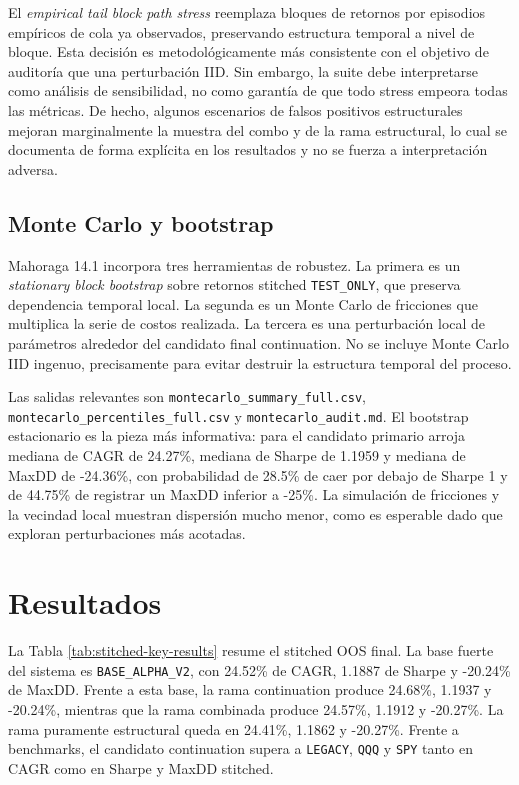 \documentclass[11pt]{article}
\begin{document}
El \textit{empirical tail block path stress} reemplaza bloques de retornos por episodios emp\'iricos de cola ya observados, preservando estructura temporal a nivel de bloque. Esta decisi\'on es metodol\'ogicamente m\'as consistente con el objetivo de auditor\'ia que una perturbaci\'on IID. Sin embargo, la suite debe interpretarse como an\'alisis de sensibilidad, no como garant\'ia de que todo stress empeora todas las m\'etricas. De hecho, algunos escenarios de falsos positivos estructurales mejoran marginalmente la muestra del combo y de la rama estructural, lo cual se documenta de forma expl\'icita en los resultados y no se fuerza a interpretaci\'on adversa.

\subsection*{Monte Carlo y bootstrap}
Mahoraga 14.1 incorpora tres herramientas de robustez. La primera es un \textit{stationary block bootstrap} sobre retornos stitched \texttt{TEST\_ONLY}, que preserva dependencia temporal local. La segunda es un Monte Carlo de fricciones que multiplica la serie de costos realizada. La tercera es una perturbaci\'on local de par\'ametros alrededor del candidato final continuation. No se incluye Monte Carlo IID ingenuo, precisamente para evitar destruir la estructura temporal del proceso.

Las salidas relevantes son \texttt{montecarlo\_summary\_full.csv}, \texttt{montecarlo\_percentiles\_full.csv} y \texttt{montecarlo\_audit.md}. El bootstrap estacionario es la pieza m\'as informativa: para el candidato primario arroja mediana de CAGR de 24.27\%, mediana de Sharpe de 1.1959 y mediana de MaxDD de -24.36\%, con probabilidad de 28.5\% de caer por debajo de Sharpe 1 y de 44.75\% de registrar un MaxDD inferior a -25\%. La simulaci\'on de fricciones y la vecindad local muestran dispersi\'on mucho menor, como es esperable dado que exploran perturbaciones m\'as acotadas.

\section{Resultados}
La Tabla \ref{tab:stitched-key-results} resume el stitched OOS final. La base fuerte del sistema es \texttt{BASE\_ALPHA\_V2}, con 24.52\% de CAGR, 1.1887 de Sharpe y -20.24\% de MaxDD. Frente a esta base, la rama continuation produce 24.68\%, 1.1937 y -20.24\%, mientras que la rama combinada produce 24.57\%, 1.1912 y -20.27\%. La rama puramente estructural queda en 24.41\%, 1.1862 y -20.27\%. Frente a benchmarks, el candidato continuation supera a \texttt{LEGACY}, \texttt{QQQ} y \texttt{SPY} tanto en CAGR como en Sharpe y MaxDD stitched.
\end{document}

